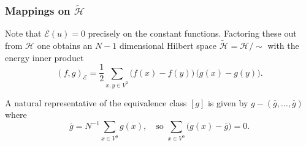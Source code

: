 \documentclass[a4paper]{amsart}
\theoremstyle{plain}
\theoremstyle{definition}
\theoremstyle{remark}
\begin{document}
\subsubsection{Mappings on $ \widetilde{\mathcal{H}} $}
Note that $ \mathcal{E} (u) = 0 $ precisely on the constant functions.
Factoring these out  from $ \mathcal{H}  $ one obtains an $ N-1 $ dimensional  Hilbert space $ \widetilde{\mathcal{H}}=  \mathcal{H} / \sim $ with   the energy inner product
\[
 (f,g)_\mathcal{E} = \frac{1}{2} \sum_{x,y\in   V^{0}} \big(f(x)-f(y)\big)\, \big(g(x) - g(y) \big).
 \]


A natural representative of  the equivalence class $ [g] $ is given by $g -  (\overline{g}  ,\dots, \overline{g}) $ where 
\[
\overline{g}=  N^{-1}\sum_{x\in V^{0}}g(x), \quad \text{so }  \sum_{x\in V^{0}}\big(g(x) - \overline{g}\big) = 0 .
\]
\end{document}
